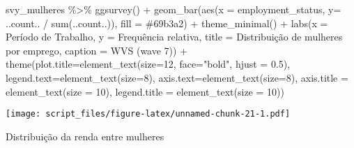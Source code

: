 \documentclass[
]{article}
\newenvironment{Shaded}{\begin{snugshade}}{\end{snugshade}}
\newcommand{\AttributeTok}[1]{\textcolor[rgb]{0.77,0.63,0.00}{#1}}
\newcommand{\DecValTok}[1]{\textcolor[rgb]{0.00,0.00,0.81}{#1}}
\newcommand{\FloatTok}[1]{\textcolor[rgb]{0.00,0.00,0.81}{#1}}
\newcommand{\FunctionTok}[1]{\textcolor[rgb]{0.00,0.00,0.00}{#1}}
\newcommand{\NormalTok}[1]{#1}
\newcommand{\SpecialCharTok}[1]{\textcolor[rgb]{0.00,0.00,0.00}{#1}}
\newcommand{\StringTok}[1]{\textcolor[rgb]{0.31,0.60,0.02}{#1}}
\begin{document}
\begin{Shaded}
\begin{Highlighting}[]
\NormalTok{svy\_mulheres }\SpecialCharTok{\%\textgreater{}\%}
  \FunctionTok{ggsurvey}\NormalTok{() }\SpecialCharTok{+}
  \FunctionTok{geom\_bar}\NormalTok{(}\FunctionTok{aes}\NormalTok{(}\AttributeTok{x =}\NormalTok{ employment\_status, }\AttributeTok{y=}\NormalTok{ ..count.. }\SpecialCharTok{/} \FunctionTok{sum}\NormalTok{(..count..)), }\AttributeTok{fill =} \StringTok{\textquotesingle{}\#69b3a2\textquotesingle{}}\NormalTok{) }\SpecialCharTok{+}
  \FunctionTok{theme\_minimal}\NormalTok{() }\SpecialCharTok{+}
  \FunctionTok{labs}\NormalTok{(}\AttributeTok{x =} \StringTok{\textquotesingle{}Período de Trabalho\textquotesingle{}}\NormalTok{,}
       \AttributeTok{y =} \StringTok{\textquotesingle{}Frequência relativa\textquotesingle{}}\NormalTok{,}
       \AttributeTok{title =} \StringTok{\textquotesingle{}Distribuição de mulheres por emprego\textquotesingle{}}\NormalTok{,}
       \AttributeTok{caption =} \StringTok{\textquotesingle{}WVS (wave 7)\textquotesingle{}}\NormalTok{) }\SpecialCharTok{+}
  \FunctionTok{theme}\NormalTok{(}\AttributeTok{plot.title=}\FunctionTok{element\_text}\NormalTok{(}\AttributeTok{size=}\DecValTok{12}\NormalTok{, }\AttributeTok{face=}\StringTok{"bold"}\NormalTok{, }\AttributeTok{hjust =} \FloatTok{0.5}\NormalTok{),}
        \AttributeTok{legend.text=}\FunctionTok{element\_text}\NormalTok{(}\AttributeTok{size=}\DecValTok{8}\NormalTok{),}
        \AttributeTok{axis.text=}\FunctionTok{element\_text}\NormalTok{(}\AttributeTok{size=}\DecValTok{8}\NormalTok{),}
        \AttributeTok{axis.title =} \FunctionTok{element\_text}\NormalTok{(}\AttributeTok{size =} \DecValTok{10}\NormalTok{),}
        \AttributeTok{legend.title =} \FunctionTok{element\_text}\NormalTok{(}\AttributeTok{size =} \DecValTok{10}\NormalTok{))}
\end{Highlighting}
\end{Shaded}

\texttt{[image: script\_files/figure-latex/unnamed-chunk-21-1.pdf]}

Distribuição da renda entre mulheres
\end{document}
